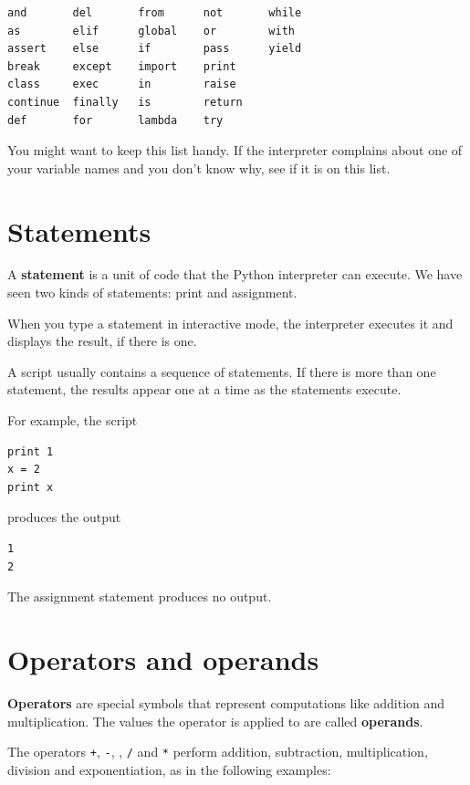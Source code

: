 \documentclass[10pt]{book}
\begin{document}
\beforeverb
\begin{verbatim}
and       del       from      not       while    
as        elif      global    or        with     
assert    else      if        pass      yield    
break     except    import    print              
class     exec      in        raise              
continue  finally   is        return             
def       for       lambda    try
\end{verbatim}
\afterverb
%
You might want to keep this list handy.  If the interpreter complains
about one of your variable names and you don't know why, see if it
is on this list.

\section{Statements}

A {\bf statement} is a unit of code that the Python interpreter can
execute.  We have seen two kinds of statements: print
and assignment.


When you type a statement in interactive mode, the interpreter
executes it and displays the result, if there is one.

A script usually contains a sequence of statements.  If there
is more than one statement, the results appear one at a time
as the statements execute.

For example, the script

\beforeverb
\begin{verbatim}
print 1
x = 2
print x
\end{verbatim}
\afterverb
%
produces the output

\beforeverb
\begin{verbatim}
1
2
\end{verbatim}
\afterverb
%
The assignment statement produces no output.


\section{Operators and operands}

{\bf Operators} are special symbols that represent computations like
addition and multiplication.  The values the operator is applied to
are called {\bf operands}.

The operators {\tt +}, {\tt -}, {\tt *}, {\tt /} and {\tt **}
perform addition, subtraction, multiplication, division and
exponentiation, as in the following examples:
\end{document}
